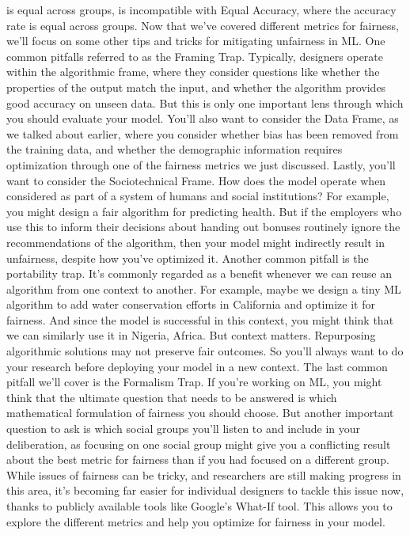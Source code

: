 is equal across groups, is incompatible with Equal Accuracy,
where the accuracy rate is equal across groups.
Now that we've covered different metrics for fairness,
we'll focus on some other tips and tricks for mitigating unfairness in ML.
One common pitfalls referred to as the Framing Trap.
Typically, designers operate within the algorithmic frame,
where they consider questions like whether the properties of the output
match the input, and whether the algorithm provides
good accuracy on unseen data.
But this is only one important lens through which
you should evaluate your model.
You'll also want to consider the Data Frame,
as we talked about earlier, where you consider whether bias has been removed
from the training data, and whether the demographic information
requires optimization through one of the fairness metrics we just discussed.
Lastly, you'll want to consider the Sociotechnical Frame.
How does the model operate when considered
as part of a system of humans and social institutions?
For example, you might design a fair algorithm for predicting health.
But if the employers who use this to inform their decisions about handing
out bonuses routinely ignore the recommendations of the algorithm,
then your model might indirectly result in unfairness,
despite how you've optimized it.
Another common pitfall is the portability trap.
It's commonly regarded as a benefit whenever
we can reuse an algorithm from one context to another.
For example, maybe we design a tiny ML algorithm
to add water conservation efforts in California
and optimize it for fairness.
And since the model is successful in this context,
you might think that we can similarly use it in Nigeria, Africa.
But context matters.
Repurposing algorithmic solutions may not preserve fair outcomes.
So you'll always want to do your research before deploying
your model in a new context.
The last common pitfall we'll cover is the Formalism Trap.
If you're working on ML, you might think that the ultimate question that
needs to be answered is which mathematical formulation of fairness
you should choose.
But another important question to ask is which
social groups you'll listen to and include in your deliberation,
as focusing on one social group might give you
a conflicting result about the best metric for fairness
than if you had focused on a different group.
While issues of fairness can be tricky, and researchers are still
making progress in this area, it's becoming far easier
for individual designers to tackle this issue now,
thanks to publicly available tools like Google's What-If tool.
This allows you to explore the different metrics
and help you optimize for fairness in your model.

